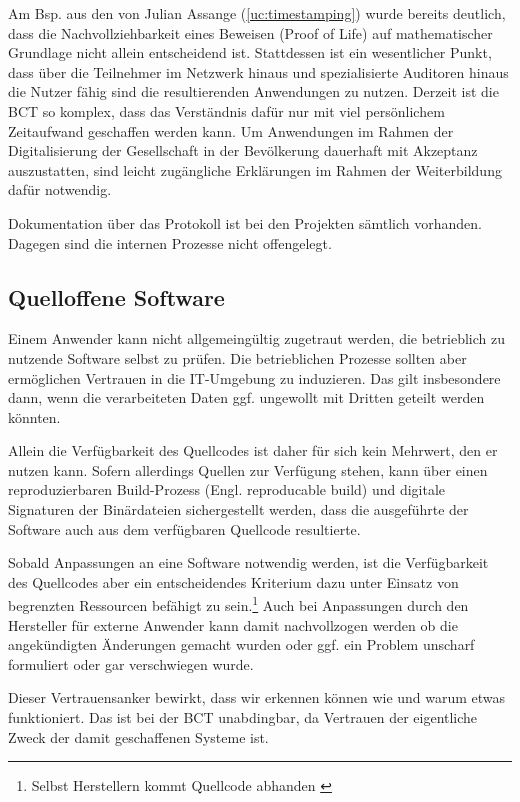 Am Bsp. aus den  von Julian Assange (\ref{uc:timestamping}) wurde bereits deutlich, dass die Nachvollziehbarkeit eines Beweisen (Proof of Life) auf mathematischer Grundlage nicht allein entscheidend ist.
Stattdessen ist ein wesentlicher Punkt, dass über die Teilnehmer im Netzwerk hinaus und spezialisierte Auditoren hinaus die Nutzer fähig sind die resultierenden Anwendungen zu nutzen.
Derzeit ist die \gls{BCT} so komplex, dass das Verständnis dafür nur mit viel persönlichem Zeitaufwand geschaffen werden kann.
Um Anwendungen im Rahmen der Digitalisierung der Gesellschaft in der Bevölkerung dauerhaft mit Akzeptanz auszustatten, sind leicht zugängliche Erklärungen im Rahmen der Weiterbildung dafür notwendig.

Dokumentation über das Protokoll ist bei den Projekten sämtlich vorhanden.
Dagegen sind die internen Prozesse nicht offengelegt.

\subsection{Quelloffene Software}\label{krit:opensource}

Einem Anwender kann nicht allgemeingültig zugetraut werden, die betrieblich zu nutzende Software selbst zu prüfen. Die betrieblichen Prozesse sollten aber ermöglichen Vertrauen in die IT-Umgebung zu induzieren. Das gilt insbesondere dann, wenn die verarbeiteten Daten ggf. ungewollt mit Dritten geteilt werden könnten.

Allein die Verfügbarkeit des Quellcodes ist daher für sich kein Mehrwert, den er nutzen kann.
Sofern allerdings Quellen zur Verfügung stehen, kann \ua{} über einen reproduzierbaren Build-Prozess (Engl. reproducable build) und digitale Signaturen der Binärdateien sichergestellt werden, dass die ausgeführte der Software auch aus dem verfügbaren Quellcode resultierte.

Sobald Anpassungen an eine Software notwendig werden, ist die Verfügbarkeit des Quellcodes aber ein entscheidendes Kriterium dazu unter Einsatz von begrenzten Ressourcen befähigt zu sein.\footnote{Selbst Herstellern kommt Quellcode abhanden \autocite{w:ms-binpatch}}
Auch bei Anpassungen durch den Hersteller für externe Anwender kann damit nachvollzogen werden ob die angekündigten Änderungen gemacht wurden oder ggf. ein Problem unscharf formuliert oder gar verschwiegen wurde.

Dieser Vertrauensanker bewirkt, dass wir erkennen können wie und warum etwas funktioniert.
Das ist bei der \gls{BCT} unabdingbar, da Vertrauen der eigentliche Zweck der damit geschaffenen Systeme ist.

